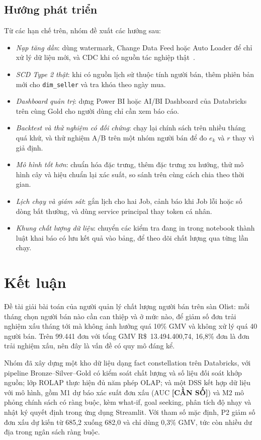 \documentclass[a4paper]{article}
\begin{document}
\subsection{Hướng phát triển}
\label{subsec:6_4}

Từ các hạn chế trên, nhóm đề xuất các hướng sau:
\begin{itemize}
  \item \textit{Nạp tăng dần}: dùng watermark, Change Data Feed hoặc Auto Loader để chỉ xử lý dữ liệu mới, và CDC khi có nguồn tác nghiệp thật~\cite{bib:databricks}.
  \item \textit{SCD Type 2 thật}: khi có nguồn lịch sử thuộc tính người bán, thêm phiên bản mới cho \texttt{dim\_seller} và tra khóa theo ngày mua.
  \item \textit{Dashboard quản trị}: dựng Power BI hoặc AI/BI Dashboard của Databricks trên cùng Gold cho người dùng chỉ cần xem báo cáo.
  \item \textit{Backtest và thử nghiệm có đối chứng}: chạy lại chính sách trên nhiều tháng quá khứ, và thử nghiệm A/B trên một nhóm người bán để đo $e_k$ và $r$ thay vì giả định.
  \item \textit{Mô hình tốt hơn}: chuẩn hóa đặc trưng, thêm đặc trưng xu hướng, thử mô hình cây và hiệu chuẩn lại xác suất, so sánh trên cùng cách chia theo thời gian.
  \item \textit{Lịch chạy và giám sát}: gắn lịch cho hai Job, cảnh báo khi Job lỗi hoặc số dòng bất thường, và dùng service principal thay token cá nhân.
  \item \textit{Khung chất lượng dữ liệu}: chuyển các kiểm tra đang in trong notebook thành luật khai báo có lưu kết quả vào bảng, để theo dõi chất lượng qua từng lần chạy.
\end{itemize}

\section{Kết luận}
\label{sec:ch7}

Đề tài giải bài toán của người quản lý chất lượng người bán trên sàn Olist: mỗi tháng chọn người bán nào cần can thiệp và ở mức nào, để giảm số đơn trải nghiệm xấu tháng tới mà không ảnh hưởng quá 10\% GMV và không xử lý quá 40 người bán. Trên 99.441 đơn với tổng GMV R\$~13.494.400,74, 16,8\% đơn là đơn trải nghiệm xấu, nên đây là vấn đề có quy mô đáng kể.

Nhóm đã xây dựng một kho dữ liệu dạng fact constellation trên Databricks, với pipeline Bronze--Silver--Gold có kiểm soát chất lượng và số liệu đối soát khớp nguồn; lớp ROLAP thực hiện đủ năm phép OLAP; và một DSS kết hợp dữ liệu với mô hình, gồm M1 dự báo xác suất đơn xấu (AUC \textbf{[CẦN SỐ]}) và M2 mô phỏng chính sách có ràng buộc, kèm what-if, goal seeking, phân tích độ nhạy và nhật ký quyết định trong ứng dụng Streamlit. Với tham số mặc định, P2 giảm số đơn xấu dự kiến từ 685,2 xuống 682,0 và chỉ dùng 0,3\% GMV, tức còn nhiều dư địa trong ngân sách ràng buộc.
\end{document}
